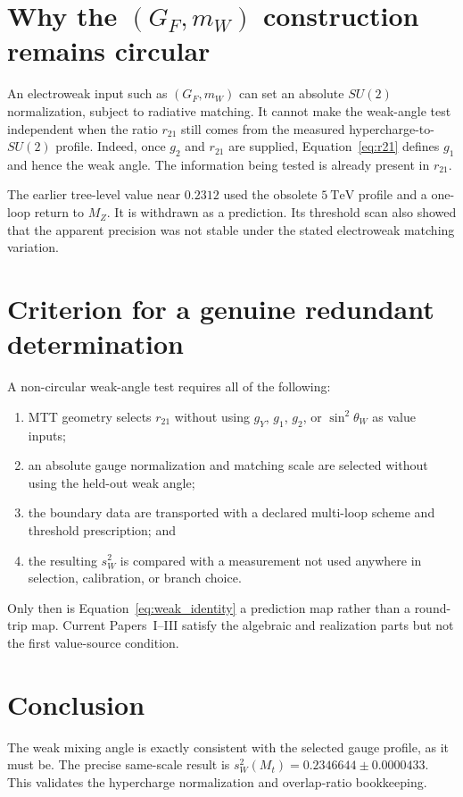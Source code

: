 \documentclass[11pt]{article}
\begin{document}
\section{Why the $(G_F,m_W)$ construction remains circular}

An electroweak input such as $(G_F,m_W)$ can set an absolute $SU(2)$
normalization, subject to radiative matching. It cannot make the weak-angle
test independent when the ratio $r_{21}$ still comes from the measured
hypercharge-to-$SU(2)$ profile. Indeed, once $g_2$ and $r_{21}$ are supplied,
Equation~\eqref{eq:r21} defines $g_1$ and hence the weak angle. The information
being tested is already present in $r_{21}$.

The earlier tree-level value near $0.2312$ used the obsolete $5~\mathrm{TeV}$
profile and a one-loop return to $M_Z$. It is withdrawn as a prediction. Its
threshold scan also showed that the apparent precision was not stable under
the stated electroweak matching variation.

\section{Criterion for a genuine redundant determination}

A non-circular weak-angle test requires all of the following:
\begin{enumerate}
\item MTT geometry selects $r_{21}$ without using $g_Y$, $g_1$, $g_2$, or
$\sin^2\theta_W$ as value inputs;
\item an absolute gauge normalization and matching scale are selected without
using the held-out weak angle;
\item the boundary data are transported with a declared multi-loop scheme and
threshold prescription; and
\item the resulting $s_W^2$ is compared with a measurement not used anywhere
in selection, calibration, or branch choice.
\end{enumerate}
Only then is Equation~\eqref{eq:weak_identity} a prediction map rather than a
round-trip map. Current Papers~I--III satisfy the algebraic and realization
parts but not the first value-source condition.

\section{Conclusion}

The weak mixing angle is exactly consistent with the selected gauge profile,
as it must be. The precise same-scale result is
$s_W^2(M_t)=0.2346644\pm0.0000433$. This validates the hypercharge
normalization and overlap-ratio bookkeeping.
\end{document}
